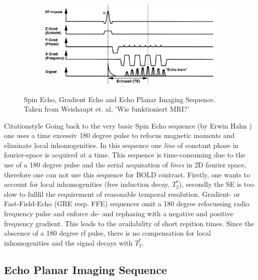 \documentclass[a4paper]{scrartcl}
\begin{document}
\begin{figure}[hbt]
\begin{subfigure}[r]{0.9\textwidth}
    \includegraphics[width = .9\textwidth]{pictures/episeq.png}
    \label{subfig:epi}
    \end{subfigure}
  \caption{Spin Echo, Gradient Echo and Echo Planar Imaging Sequence. Taken from Weishaupt et. al, 'Wie funktioniert MRI?'\cite{weishaupt}}
\end{figure}
Citationstyle
Going back to the very basic Spin Echo sequence (by Erwin Hahn \cite{hahn}) one uses a time excessiv 180 degree pulse to refocus magnetic moments and eliminate local inhomogenities.
 In this sequence one \textit{line} of constant phase in fourier-space is acquired at a time.
This sequence is time-consuming due to the use of a 180 degree pulse and the serial acquisation of \textit{lines} in 2D fourier space, therefore one can not use this sequence for BOLD contrast. 
Firstly, one wants to account for local inhomogenities (free induction decay, $T_2^*$), secondly the SE is too slow to fullfil the requirement of reasonable temporal resolution.
Gradient- or Fast-Field-Echo (GRE resp. FFE) sequences omit a 180 degree refocussing radio frequency pulse and enforce de- and rephasing with a negative and positive frequency gradient.
This leads to the availability of short repition times.
Since the abscence of a 180 degree rf pulse, there is no compensation for local inhomogenities and the signal decays with $T_2^*$.\cite[52]{weishaupt}

\subsection{Echo Planar Imaging Sequence}
\label{sub:epi}
\end{document}
